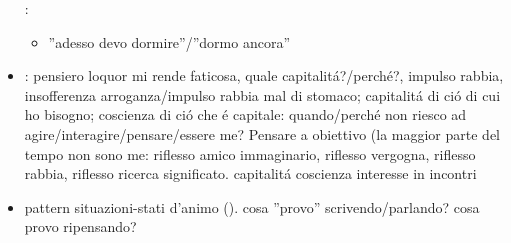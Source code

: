 \begin{itemize}
:
\begin{itemize}
\item ''adesso devo dormire''/''dormo ancora''
\end{itemize}
\item {}: pensiero loquor mi rende faticosa, quale capitalit\'a?/perch\'e?, impulso rabbia, insofferenza arroganza/impulso rabbia mal di stomaco; capitalit\'a di ci\'o di cui ho bisogno; coscienza di ci\'o che \'e capitale: quando/perch\'e non riesco ad agire/interagire/pensare/essere me? Pensare a obiettivo (la maggior parte del tempo non sono me: riflesso amico immaginario, riflesso vergogna, riflesso rabbia, riflesso ricerca significato.
capitalit\'a coscienza interesse in incontri
\item pattern situazioni-stati d'animo (). cosa ''provo'' scrivendo/parlando? cosa provo ripensando?
\end{itemize}

